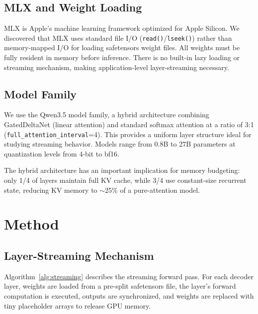 \documentclass[10pt,a4paper]{article}
\begin{document}
\subsection{MLX and Weight Loading}

MLX is Apple's machine learning framework optimized for Apple Silicon. We discovered that MLX uses standard file I/O (\texttt{read()}/\texttt{lseek()}) rather than memory-mapped I/O for loading safetensors weight files. All weights must be fully resident in memory before inference. There is no built-in lazy loading or streaming mechanism, making application-level layer-streaming necessary.

\subsection{Model Family}

We use the Qwen3.5 model family, a hybrid architecture combining GatedDeltaNet (linear attention) and standard softmax attention at a ratio of 3:1 (\texttt{full\_attention\_interval}=4). This provides a uniform layer structure ideal for studying streaming behavior. Models range from 0.8B to 27B parameters at quantization levels from 4-bit to bf16.

The hybrid architecture has an important implication for memory budgeting: only 1/4 of layers maintain full KV cache, while 3/4 use constant-size recurrent state, reducing KV memory to $\sim$25\% of a pure-attention model.

\section{Method}

\subsection{Layer-Streaming Mechanism}

Algorithm~\ref{alg:streaming} describes the streaming forward pass. For each decoder layer, weights are loaded from a pre-split safetensors file, the layer's forward computation is executed, outputs are synchronized, and weights are replaced with tiny placeholder arrays to release GPU memory.
\end{document}

